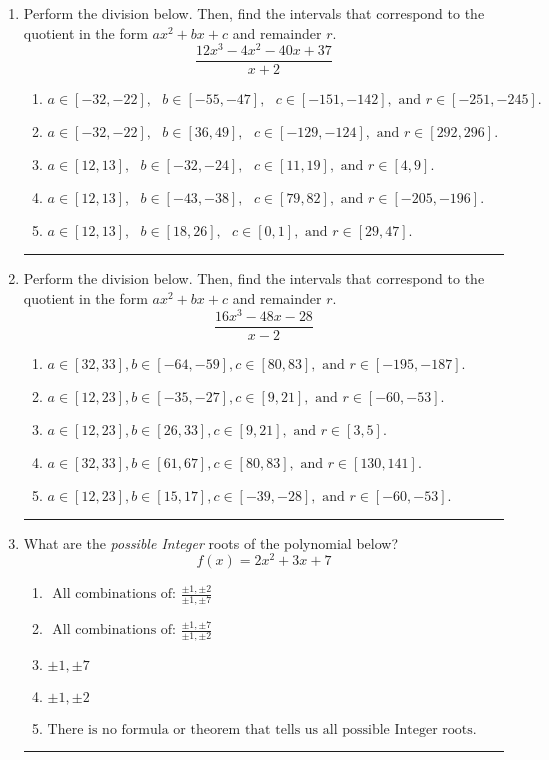 \documentclass[14pt]{extbook}
\newcommand{\litem}[1]{\item#1\hspace*{-1cm}\rule{\textwidth}{0.4pt}}
\begin{document}
\begin{enumerate}
{\begin{enumerate}[label=\Alph*.]
\end{enumerate} }
\litem{
Perform the division below. Then, find the intervals that correspond to the quotient in the form $ax^2+bx+c$ and remainder $r$.\[ \frac{12x^{3} -4 x^{2} -40 x + 37}{x + 2} \]\begin{enumerate}[label=\Alph*.]
\item \( a \in [-32, -22], \text{   } b \in [-55, -47], \text{   } c \in [-151, -142], \text{   and   } r \in [-251, -245]. \)
\item \( a \in [-32, -22], \text{   } b \in [36, 49], \text{   } c \in [-129, -124], \text{   and   } r \in [292, 296]. \)
\item \( a \in [12, 13], \text{   } b \in [-32, -24], \text{   } c \in [11, 19], \text{   and   } r \in [4, 9]. \)
\item \( a \in [12, 13], \text{   } b \in [-43, -38], \text{   } c \in [79, 82], \text{   and   } r \in [-205, -196]. \)
\item \( a \in [12, 13], \text{   } b \in [18, 26], \text{   } c \in [0, 1], \text{   and   } r \in [29, 47]. \)

\end{enumerate} }
\litem{
Perform the division below. Then, find the intervals that correspond to the quotient in the form $ax^2+bx+c$ and remainder $r$.\[ \frac{16x^{3} -48 x -28}{x -2} \]\begin{enumerate}[label=\Alph*.]
\item \( a \in [32, 33], b \in [-64, -59], c \in [80, 83], \text{ and } r \in [-195, -187]. \)
\item \( a \in [12, 23], b \in [-35, -27], c \in [9, 21], \text{ and } r \in [-60, -53]. \)
\item \( a \in [12, 23], b \in [26, 33], c \in [9, 21], \text{ and } r \in [3, 5]. \)
\item \( a \in [32, 33], b \in [61, 67], c \in [80, 83], \text{ and } r \in [130, 141]. \)
\item \( a \in [12, 23], b \in [15, 17], c \in [-39, -28], \text{ and } r \in [-60, -53]. \)

\end{enumerate} }
\litem{
What are the \textit{possible Integer} roots of the polynomial below?\[ f(x) = 2x^{2} +3 x + 7 \]\begin{enumerate}[label=\Alph*.]
\item \( \text{ All combinations of: }\frac{\pm 1,\pm 2}{\pm 1,\pm 7} \)
\item \( \text{ All combinations of: }\frac{\pm 1,\pm 7}{\pm 1,\pm 2} \)
\item \( \pm 1,\pm 7 \)
\item \( \pm 1,\pm 2 \)
\item \( \text{There is no formula or theorem that tells us all possible Integer roots.} \)


\end{enumerate}}
\end{enumerate}
\end{document}
